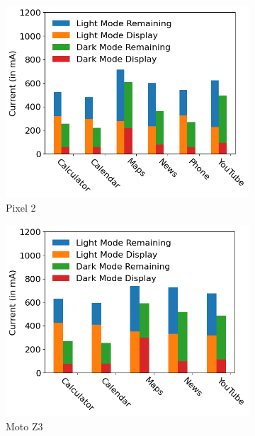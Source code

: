\begin{figure}[tb]
	\begin{subfigure}[]{0.32\textwidth}
		\includegraphics[width=\textwidth]{figure/002_Pixel2_case_study.png}
        \vspace{-0.2in}
		\caption{Pixel 2}
	\end{subfigure}
	\begin{subfigure}[]{0.32\textwidth}
		\includegraphics[width=\textwidth]{figure/003_MotoZ3_case_study.png}
        \vspace{-0.2in}
		\caption{Moto Z3}
	\end{subfigure}
	\begin{subfigure}[]{0.32\textwidth}

\end{subfigure}
\end{figure}
